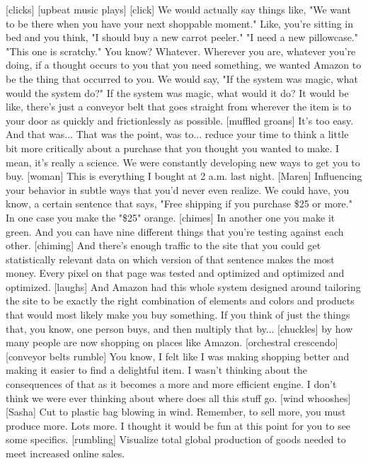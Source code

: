 \documentclass[a4paper]{article}
\begin{document}
	[clicks]
	[upbeat music plays]
	[click]
	We would actually say things like, "We want to be there when
	you have your next shoppable moment."
	Like, you're sitting in bed and you think, "I should buy a new carrot peeler."
	"I need a new pillowcase."
	"This one is scratchy." You know? Whatever.
	Wherever you are, whatever you're doing,
	if a thought occurs to you that you need something,
	we wanted Amazon to be the thing that occurred to you.
	We would say, "If the system was magic, what would the system do?"
	If the system was magic, what would it do?
	It would be like,
	there's just a conveyor belt that goes straight from wherever the item is
	to your door as quickly and frictionlessly as possible.
	[muffled groans]
	It's too easy. And that was... That was the point,
	was to...
	reduce your time to think a little bit more critically about
	a purchase that you thought you wanted to make.
	I mean, it's really a science.
	We were constantly developing new ways to get you to buy.
	[woman] This is everything I bought at 2 a.m. last night.
	[Maren] Influencing your behavior in subtle ways that you'd never even realize.
	We could have, you know, a certain sentence that says,
	"Free shipping if you purchase \$25 or more."
	In one case you make the "\$25" orange.
	[chimes]
	In another one you make it green.
	And you can have nine different things that you're testing against each other.
	[chiming]
	And there's enough traffic to the site
	that you could get statistically relevant data
	on which version of that sentence
	makes the most money.
	Every pixel on that page was
	tested and optimized and optimized and optimized.
	[laughs] And Amazon had this whole system designed around
	tailoring the site to be exactly
	the right combination of elements and colors and products
	that would most likely make you buy something.
	If you think of just the things that, you know, one person buys,
	and then multiply that by... [chuckles]
	by how many people are now shopping on places like Amazon.
	[orchestral crescendo]
	[conveyor belts rumble]
	You know, I felt like I was making shopping better
	and making it easier to find a delightful item.
	I wasn't thinking about the consequences of that
	as it becomes a more and more efficient engine.
	I don't think we were ever thinking about where does all this stuff go.
	[wind whooshes]
	[Sasha] Cut to plastic bag blowing in wind.
	Remember, to sell more, you must produce more.
	Lots more.
	I thought it would be fun at this point for you to see some specifics.
	[rumbling]
	Visualize total global production
	of goods needed to meet increased online sales.
\end{document}
